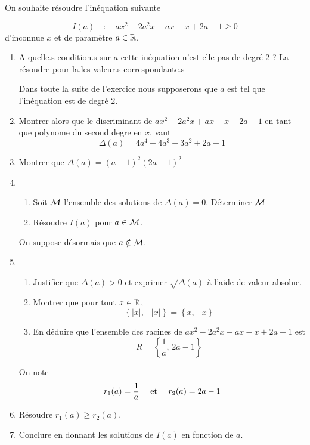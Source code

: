 \documentclass[a4paper, 11pt]{article}
\begin{document}
\begin{exercice}
    On souhaite résoudre l'inéquation suivante 

    $$I(a)\quad  : \quad  ax^2 -2a^2x +ax-x+2a-1\geq 0$$
    d'inconnue $x$ et de paramètre $a\in \mathbb{R}$.

    \begin{enumerate}
        \item A quelle.s condition.s sur $a$ cette inéquation n'est-elle pas de degré 2 ? La résoudre pour la.les valeur.s correspondante.s

        Dans toute la suite de l'exercice nous supposerons que $a$ est tel que l'inéquation est de degré $2$.
        \item Montrer alors que le discriminant de $ ax^2 -2a^2x +ax-x+2a-1$ en tant que polynome du second degre en $x$, vaut 
        $$\Delta(a) = 4a^4-4a^3-3a^2+2a+1$$
        \item Montrer que $\Delta(a)=(a-1)^2(2a+1)^2$
        \item \begin{enumerate}
            \item   Soit $\mathcal{M}$ l'ensemble des solutions de  $\Delta(a)=0$. Déterminer $\mathcal{M}$
            \item Résoudre $I(a)$ pour $a\in \mathcal{M}$. 
        \end{enumerate} 

        On suppose désormais que $a\notin \mathcal{M}$.
      
        
        \item \begin{enumerate}
            \item Justifier que $\Delta(a)> 0 $ et exprimer $\sqrt{\Delta(a)}$ à l'aide de valeur absolue. 
            \item Montrer que pour tout $x\in \mathbb{R}$, 
                $$\left\{ |x|,-|x|\right\} = \left\{x,-x\right\}$$
            \item En déduire que l'ensemble des racines de $ax^2 -2a^2x +ax-x+2a-1$ est 
            $$R=\left\{ \frac{1}{a} , \,  2a-1\right\}  $$
           
        \end{enumerate}
On note  $$r_1(a) = \frac{1}{a} \quad \text{ et } \quad r_2(a) = 2a-1$$
        
        \item Résoudre $r_1(a)\geq r_2(a)$.
        \item Conclure en donnant les solutions de $I(a)$ en fonction de $a$.
        

        
    \end{enumerate}

    
\end{exercice}
\end{document}
